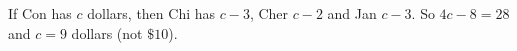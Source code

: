 If Con has $c$ dollars, then Chi has $c-3$, Cher $c-2$ and Jan $c-3$. So $4c-8=28$ and $c=\boxed{9}$ dollars (not $\$10$).
